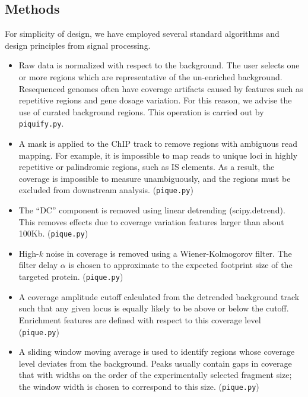 \documentclass{bioinfo}
\begin{document}
{\begin{methods}
\section{Methods}

For simplicity of design, we have employed several standard algorithms
and design principles from signal processing.

\begin{itemize}

\item Raw data is normalized with respect to the background. The user
  selects one or more regions which are representative of the
  un-enriched background. Resequenced genomes often have coverage
  artifacts caused by features such as repetitive regions and gene
  dosage variation. For this reason, we advise the use of curated
  background regions. This operation is carried out by
  \texttt{piquify.py}.

\item A mask is applied to the ChIP track to remove regions with
  ambiguous read mapping. For example, it is impossible to map reads
  to unique loci in highly repetitive or palindromic regions, such as
  IS elements. As a result, the coverage is impossible to measure
  unambiguously, and the regions must be excluded from downstream
  analysis. (\texttt{pique.py})

\item The ``DC'' component is removed using linear detrending
  (scipy.detrend). This removes effects due to coverage variation
  features larger than about 100Kb. (\texttt{pique.py})

\item High-$k$ noise in coverage is removed using a Wiener-Kolmogorov
  filter. The filter delay $\alpha$ is chosen to approximate to the
  expected footprint size of the targeted protein. (\texttt{pique.py})

\item A coverage amplitude cutoff calculated from the detrended
  background track such that any given locus is equally likely to be
  above or below the cutoff. Enrichment features are defined with
  respect to this coverage level (\texttt{pique.py})

\item A sliding window moving average is used to identify regions
  whose coverage level deviates from the background. Peaks usually
  contain gaps in coverage that with widths on the order of the
  experimentally selected fragment size; the window width is chosen to
  correspond to this size. (\texttt{pique.py})



\end{itemize}
\end{methods}}
\end{document}
